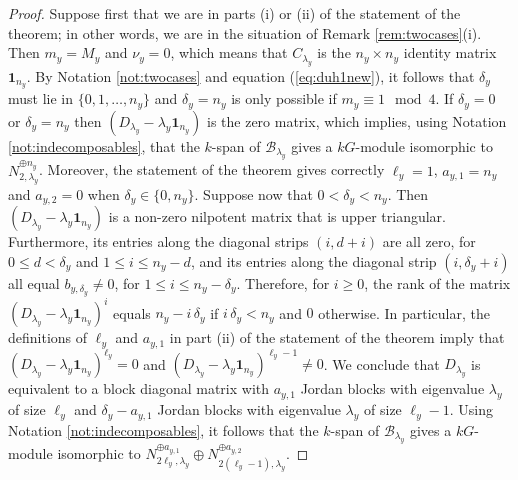 \documentclass{amsart}
\numberwithin{equation}{section}
\numberwithin{table}{section}
\theoremstyle{plain}
\theoremstyle{definition}
\theoremstyle{remark}
\begin{document}
\begin{proof}
Suppose first that we are in parts (i) or (ii) of the statement of the theorem; in other words, we are in the situation of Remark \ref{rem:twocases}(i). Then $m_y=M_y$ and $\nu_y=0$, which means that $C_{\lambda_y}$ is the $n_y\times n_y$ identity matrix $\mathbf{1}_{n_y}$. By Notation \ref{not:twocases} and equation (\ref{eq:duh1new}), it follows that $\delta_y$ must lie in $\{0,1,\ldots, n_y\}$ and $\delta_y=n_y$ is only possible if $m_y\equiv 1\mod 4$. If $\delta_y=0$ or $\delta_y=n_y$ then $(D_{\lambda_y}-\lambda_y\mathbf{1}_{n_y})$ is the zero matrix, which implies, using Notation \ref{not:indecomposables}, that the $k$-span of $\mathcal{B}_{\lambda_y}$ gives a $kG$-module isomorphic to $N_{2,\lambda_y}^{\oplus n_y}$. Moreover, the statement of the theorem gives correctly $\ell_y=1$, $a_{y,1}=n_y$ and $a_{y,2}=0$ when $\delta_y\in\{0,n_y\}$. Suppose now that $0<\delta_y< n_y$. Then $(D_{\lambda_y}-\lambda_y\mathbf{1}_{n_y})$ is a non-zero nilpotent matrix that is upper triangular. Furthermore, its entries along the diagonal strips $(i,d+i)$ are all zero, for $0\le d <\delta_y$ and $1\le i \le n_y-d$, and its entries along the diagonal strip $(i,\delta_y+i)$ all equal $b_{y,\delta_y}\ne 0$, for $1\le i \le n_y-\delta_y$. Therefore, for $i\ge 0$, the rank of the matrix $(D_{\lambda_y}-\lambda_y\mathbf{1}_{n_y})^i$ equals $n_y-i\,\delta_y$ if $i\,\delta_y < n_y$ and $0$ otherwise. In particular, the definitions of $\ell_y$ and $a_{y,1}$ in part (ii) of the statement of the theorem imply that $(D_{\lambda_y}-\lambda_y\mathbf{1}_{n_y})^{\ell_y}= 0$ and $(D_{\lambda_y}-\lambda_y\mathbf{1}_{n_y})^{\ell_y-1}\ne 0$. We conclude that $D_{\lambda_y}$ is equivalent to a block diagonal matrix with $a_{y,1}$ Jordan blocks with eigenvalue $\lambda_y$ of size $\ell_y$ and $\delta_y-a_{y,1}$ Jordan blocks with eigenvalue $\lambda_y$ of size $\ell_y-1$. Using Notation \ref{not:indecomposables}, it follows that the $k$-span of $\mathcal{B}_{\lambda_y}$ gives a $kG$-module isomorphic to $N_{2\ell_y,\lambda_y}^{\oplus a_{y,1}} \oplus N_{2(\ell_y-1),\lambda_y}^{\oplus a_{y,2}}$.


\end{proof}
\end{document}
